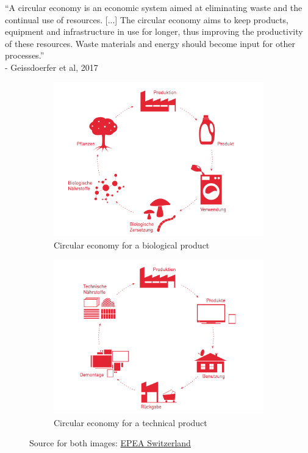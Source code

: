\documentclass[11pt]{article}
\theoremstyle{definition}
\begin{document}
\begin{definition}
	\textquotedblleft A circular economy is an economic system aimed at eliminating waste and the continual use of resources. [...] The circular economy aims to keep products, equipment and infrastructure in use for longer, thus improving the productivity of these resources. Waste materials and energy should become input for other processes.\textquotedblright\\
	\hspace*{1em} - Geissdoerfer et al, 2017
\end{definition}

\begin{figure}[H]
	\begin{subfigure}[b]{0.48\linewidth}
		\centering
		\includegraphics[width=\linewidth]{img/circular_economy_biological.png}
		\caption{Circular economy for a biological product}
	\end{subfigure}
	\hfill
	\begin{subfigure}[b]{0.48\linewidth}
		\centering
		\includegraphics[width=\linewidth]{img/circular_economy_technical.png}
		\caption{Circular economy for a technical product}
	\end{subfigure}
	\caption{Source for both images: \href{https://epeaswitzerland.com/cradle-to-cradle/}{EPEA Switzerland}}
\end{figure}
\end{document}

